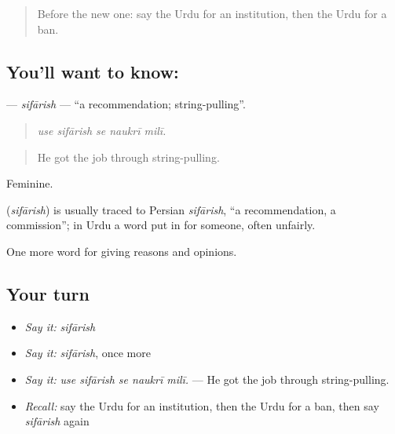 \label{lesson:UR-C357-sifarish}



\begin{quote}
Before the new one: say the Urdu for an institution, then the Urdu for a ban.
\end{quote}

\subsection*{You'll want to know: }
\textbf{} — \emph{sifārish} — \textquotedblleft{}a recommendation; string-pulling\textquotedblright{}.

\begin{quote}
    
\end{quote}

\begin{quote}
\emph{use sifārish se naukrī milī.}
\end{quote}

\begin{quote}
He got the job through string-pulling.
\end{quote}

Feminine.

\begin{cousinweb}
\textbf{} (\emph{sifārish}) is usually traced to Persian \emph{sifārish}, \textquotedblleft{}a recommendation, a commission\textquotedblright{}; in Urdu a word put in for someone, often unfairly.
\end{cousinweb}

\begin{grammarlens}[title={What you've built}]
One more word for giving reasons and opinions.
\end{grammarlens}

\subsection*{Your turn}
\begin{itemize}
\raggedright
  \item \emph{Say it:} \emph{sifārish}
  \item \emph{Say it:} \emph{sifārish}, once more
  \item \emph{Say it:} \emph{use sifārish se naukrī milī.} — He got the job through string-pulling.
  \item \emph{Recall:} say the Urdu for an institution, then the Urdu for a ban, then say \emph{sifārish} again
\end{itemize}

